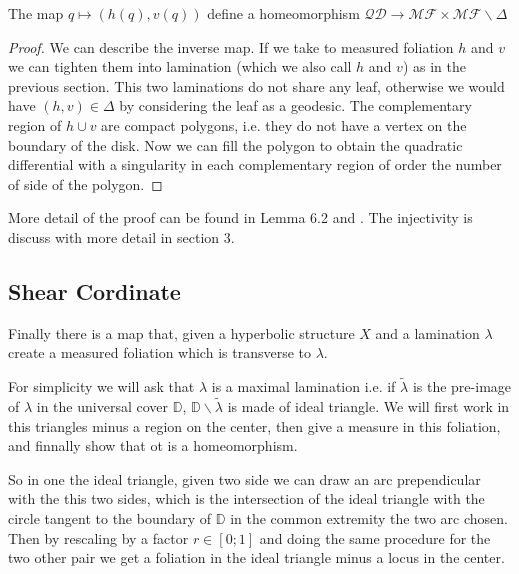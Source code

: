 \begin{thm}
The map $q \mapsto (h(q),v(q))$ define a homeomorphism $\mathcal{QD} \to \mathcal{MF} \times \mathcal{MF} \backslash \Delta$
\end{thm}

\begin{proof}
We can describe the inverse map. If we take to measured foliation $h$ and $v$ we can tighten them into lamination (which we also call $h$ and $v$) as in the previous section. This two laminations do not share any leaf, otherwise we would have $(h,v) \in \Delta$ by considering the leaf as a geodesic.
The complementary region of $h \cup v$ are compact polygons, i.e. they do not have a vertex on the boundary of the disk.
Now we can fill the polygon to obtain the quadratic differential with a singularity in each complementary region of order the number of side of the polygon.
\end{proof}

More detail of the proof can be found in \cite{casson_bleiler_1988} Lemma 6.2 and \cite{QuadHub}. The injectivity is discuss with more detail in \cite{Gardiner-1991} section 3.

\subsection{Shear Cordinate}

Finally there is a map that, given a hyperbolic structure $X$ and a lamination $\lambda$ create a measured foliation which is transverse to $\lambda$.

For simplicity we will ask that $\lambda$ is a maximal lamination i.e. if $\tilde{\lambda}$ is the pre-image of $\lambda$ in the universal cover $\mathbb{D}$, $\mathbb{D}\backslash \tilde{\lambda}$ is made of ideal triangle. We will first work in this triangles minus a region on the center, then give a measure in this foliation, and finnally show that ot is a homeomorphism.

So in one the ideal triangle, given two side we can draw an arc prependicular with the this two sides, which is the intersection of the ideal triangle with the circle tangent to the boundary of $\mathbb{D}$ in the common extremity the two arc chosen. Then by rescaling by a factor $r \in [0;1]$ and doing the same procedure for the two other pair we get a foliation in the ideal triangle minus a locus in the center.


